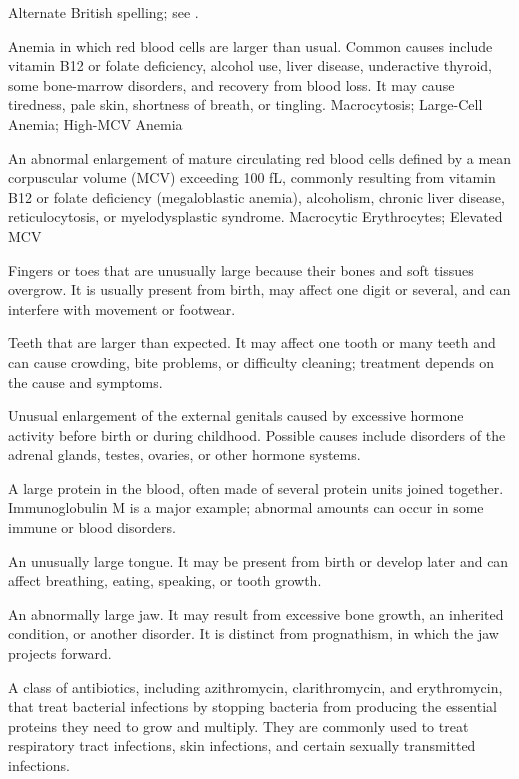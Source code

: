  Alternate British spelling; see .

 Anemia in which red blood cells are larger than usual. Common causes include vitamin B12 or folate deficiency, alcohol use, liver disease, underactive thyroid, some bone-marrow disorders, and recovery from blood loss. It may cause tiredness, pale skin, shortness of breath, or tingling.
\synonyms
Macrocytosis; Large-Cell Anemia; High-MCV Anemia

 An abnormal enlargement of mature circulating red blood cells defined by a mean corpuscular volume (MCV) exceeding 100 fL, commonly resulting from vitamin B12 or folate deficiency (megaloblastic anemia), alcoholism, chronic liver disease, reticulocytosis, or myelodysplastic syndrome.
\synonyms
Macrocytic Erythrocytes; Elevated MCV

 Fingers or toes that are unusually large because their bones and soft tissues overgrow. It is usually present from birth, may affect one digit or several, and can interfere with movement or footwear.

 Teeth that are larger than expected. It may affect one tooth or many teeth and can cause crowding, bite problems, or difficulty cleaning; treatment depends on the cause and symptoms.

 Unusual enlargement of the external genitals caused by excessive hormone activity before birth or during childhood. Possible causes include disorders of the adrenal glands, testes, ovaries, or other hormone systems.

 A large protein in the blood, often made of several protein units joined together. Immunoglobulin M is a major example; abnormal amounts can occur in some immune or blood disorders.

 An unusually large tongue. It may be present from birth or develop later and can affect breathing, eating, speaking, or tooth growth.

 An abnormally large jaw. It may result from excessive bone growth, an inherited condition, or another disorder. It is distinct from prognathism, in which the jaw projects forward.

 A class of antibiotics, including azithromycin, clarithromycin, and erythromycin, that treat bacterial infections by stopping bacteria from producing the essential proteins they need to grow and multiply. They are commonly used to treat respiratory tract infections, skin infections, and certain sexually transmitted infections.

